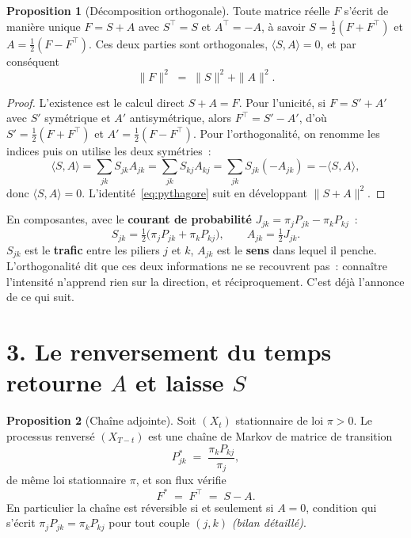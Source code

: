 \documentclass[11pt,a4paper]{article}
\theoremstyle{definition}
\newtheorem{proposition}{Proposition}
\newcommand{\T}{^{\top}}
\begin{document}
\begin{proposition}[Décomposition orthogonale]\label{prop:ortho}
Toute matrice réelle $F$ s'écrit de manière unique $F=S+A$ avec $S\T=S$ et $A\T=-A$,
à savoir $S=\tfrac12(F+F\T)$ et $A=\tfrac12(F-F\T)$. Ces deux parties sont orthogonales,
$\langle S,A\rangle=0$, et par conséquent
\begin{equation}
  \|F\|^2 \;=\; \|S\|^2 + \|A\|^2 .
  \label{eq:pythagore}
\end{equation}
\end{proposition}

\begin{proof}
L'existence est le calcul direct $S+A=F$. Pour l'unicité, si $F=S'+A'$ avec $S'$ symétrique
et $A'$ antisymétrique, alors $F\T=S'-A'$, d'où $S'=\tfrac12(F+F\T)$ et
$A'=\tfrac12(F-F\T)$. Pour l'orthogonalité, on renomme les indices puis on utilise les deux
symétries~:
\[
  \langle S,A\rangle=\sum_{jk}S_{jk}A_{jk}=\sum_{jk}S_{kj}A_{kj}
  =\sum_{jk}S_{jk}(-A_{jk})=-\langle S,A\rangle,
\]
donc $\langle S,A\rangle=0$. L'identité~\eqref{eq:pythagore} suit en développant
$\|S+A\|^2$.
\end{proof}

En composantes, avec le \textbf{courant de probabilité}
$J_{jk}=\pi_jP_{jk}-\pi_kP_{kj}$~:
\begin{equation}
  S_{jk}=\tfrac12\bigl(\pi_jP_{jk}+\pi_kP_{kj}\bigr),
  \qquad
  A_{jk}=\tfrac12 J_{jk}.
  \label{eq:composantes}
\end{equation}
$S_{jk}$ est le \textbf{trafic} entre les piliers $j$ et $k$, $A_{jk}$ est le \textbf{sens}
dans lequel il penche. L'orthogonalité dit que ces deux informations ne se recouvrent pas~:
connaître l'intensité n'apprend rien sur la direction, et réciproquement. C'est déjà
l'annonce de ce qui suit.

\section*{3. Le renversement du temps retourne $A$ et laisse $S$}

\begin{proposition}[Chaîne adjointe]\label{prop:renversement}
Soit $(X_t)$ stationnaire de loi $\pi>0$. Le processus renversé $(X_{T-t})$ est une chaîne
de Markov de matrice de transition
\begin{equation}
  P^{*}_{jk}\;=\;\frac{\pi_k P_{kj}}{\pi_j},
  \label{eq:adjointe}
\end{equation}
de même loi stationnaire $\pi$, et son flux vérifie
\begin{equation}
  F^{*} \;=\; F\T \;=\; S - A .
  \label{eq:reversal}
\end{equation}
En particulier la chaîne est réversible si et seulement si $A=0$, condition qui s'écrit
$\pi_jP_{jk}=\pi_kP_{kj}$ pour tout couple $(j,k)$ \emph{(bilan détaillé)}.
\end{proposition}
\end{document}
